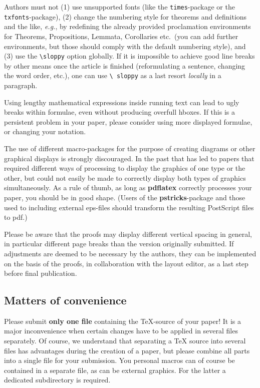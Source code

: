 \documentclass{lmcs} %
\theoremstyle{plain}\newtheorem{satz}[thm]{Satz} %
\def\eg{{\em e.g.}}
\begin{document}
  Authors must not (1) use unsupported fonts (like the
  \texttt{times}-package or the \texttt{txfonts}-package), (2) change
  the numbering style for theorems and definitions and the like, \eg,
  by redefining the already provided proclamation environments for
  Theorems, Propositions, Lemmata, Corollaries etc.\ (you can add
  further environments, but those should comply with the default
  numbering style), and (3) use the \texttt{\textbackslash sloppy}
  option globally.  If it is impossible to achieve good line breaks by
  other means once the article is finished (reformulating a sentence,
  changing the word order, etc.), one can use \texttt{\textbackslash
    sloppy} as a last resort \emph{locally} in a paragraph.

  Using lengthy mathematical expressions inside running text can lead
  to ugly breaks within formulae, even without producing overfull
  hboxes.  If this is a persistent problem in your paper, please
  consider using more displayed formulae, or changing your notation.

  The use of different macro-packages for the purpose of creating
  diagrams or other graphical displays is strongly discouraged.  In
  the past that has led to papers that required different ways of
  processing to display the graphics of one type or the other, but
  could not easily be made to correctly display both types of graphics
  simultaneously.  As a rule of thumb, as long as {\bf pdflatex}
  correctly processes your paper, you should be in good shape. (Users
  of the {\bf pstricks}-package and those used to including external
  eps-files should transform the resulting PostScript files to pdf.)

  Please be aware that the proofs may display different vertical
  spacing in general, in particular different page breaks than the
  version originally submitted.  If adjustments are deemed to be
  necessary by the authors, they can be implemented on the basis of
  the proofs, in collaboration with the layout editor, as a last step
  before final publication.

\subsection*{Matters of convenience}

  Please submit {\bf only one file} containing the
  TeX-source of your paper!  It is a major inconvenience when certain
  changes have to be applied in several files separately.  Of course,
  we understand that separating a TeX source into several files has
  advantages during the creation of a paper, but please combine all
  parts into a single file for your submission. You personal macros
  can of course be contained in a separate file, as can be external
  graphics.  For the latter a dedicated subdirectory is required.
\end{document}
